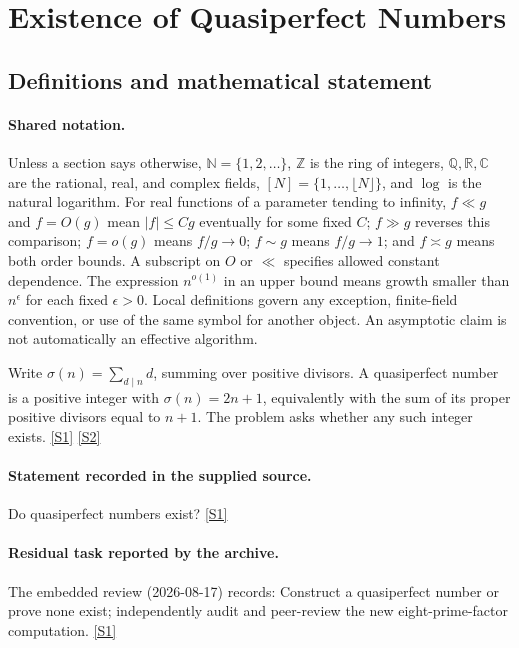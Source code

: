 \documentclass[11pt,a4paper]{article}
\newcommand{\N}{\mathbb{N}}
\newcommand{\Z}{\mathbb{Z}}
\newcommand{\Q}{\mathbb{Q}}
\newcommand{\R}{\mathbb{R}}
\newcommand{\C}{\mathbb{C}}
\newcommand{\sref}[2]{\hyperlink{source:#1:#2}{[S#2]}}
\begin{document}
\section{Existence of Quasiperfect Numbers}\label{statement}


\subsection{Definitions and mathematical statement}

\paragraph{Shared notation.}Unless a section says otherwise, $\N=\{1,2,\ldots\}$,
$\Z$ is the ring of integers, $\Q,\R,\C$ are the rational, real, and complex
fields, $[N]=\{1,\ldots,\lfloor N\rfloor\}$, and $\log$ is the natural
logarithm. For real functions of a parameter tending to infinity,
$f\ll g$ and $f=O(g)$ mean $|f|\leq Cg$ eventually for some fixed $C$;
$f\gg g$ reverses this comparison; $f=o(g)$ means $f/g\to0$;
$f\sim g$ means $f/g\to1$; and $f\asymp g$ means both order bounds.
A subscript on $O$ or $\ll$ specifies allowed constant dependence.
The expression $n^{o(1)}$ in an upper bound means growth smaller than
$n^\epsilon$ for each fixed $\epsilon>0$. Local definitions govern any
exception, finite-field convention, or use of the same symbol for another
object. An asymptotic claim is not automatically an effective algorithm.



Write $\sigma(n)=\sum_{d\mid n}d$, summing over positive divisors. A quasiperfect number is a positive integer with $\sigma(n)=2n+1$, equivalently with the sum of its proper positive divisors equal to $n+1$. The problem asks whether any such integer exists. \sref{statement}{1} \sref{statement}{2}

\paragraph{Statement recorded in the supplied source.}
Do quasiperfect numbers exist? \sref{statement}{1}

\paragraph{Residual task reported by the archive.}

The embedded review (2026-08-17) records: Construct a quasiperfect number or prove none exist; independently audit and peer-review the new eight-prime-factor computation. \sref{statement}{1}
\end{document}
